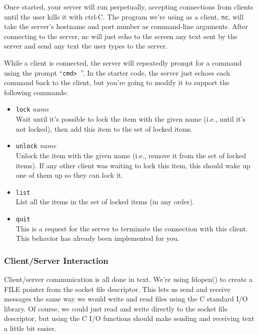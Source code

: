 \documentclass{article}
\begin{document}
\begin{enumerate}
  Once started, your server will run perpetually, accepting
  connections from clients until the user kills it with ctrl-C.  The
  program we're using as a client, \texttt{nc}, will take the server's
  hostname and port number as command-line arguments.  After
  connecting to the server, nc will just echo to the screen any text
  sent by the server and send any text the user types to the server.

  While a client is connected, the server will repeatedly prompt for a
  command using the prompt ``\verb$cmd> $''.  In the starter code, the server just
  echoes each command back to the client, but you're going to modify
  it to support the following commands:

\begin{itemize}
\item \texttt{lock} \textit{name}\\
  Wait until it's possible to lock the item with the given name (i.e.,
  until it's not locked), then add this item to the set of locked items.
  
\item \texttt{unlock} \textit{name}\\
  Unlock the item with the given name (i.e., remove it from the set of
  locked items).  If any other client was waiting to lock this item,
  this should wake up one of them up so they can lock it.

\item \texttt{list}\\
  List all the items in the set of locked items (in any order).

\item \texttt{quit}\\
  This is a request for the server to terminate the connection with this
  client.  This behavior has already been implemented for you.

\end{itemize}

\subsubsection*{Client/Server Interaction}

  Client/server communication is all done in text.  We're using
  fdopen() to create a FILE pointer from the socket file descriptor.
  This lets us send and receive messages the same way we would
  write and read files using the C standard I/O library.  Of course,
  we could just read and write directly to the socket file descriptor,
  but using the C I/O functions should make sending and receiving text
  a little bit easier.


\end{enumerate}
\end{document}
